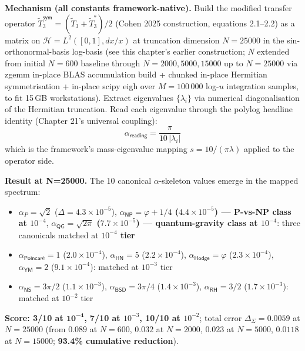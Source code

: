 \begin{level2}
\textbf{Mechanism (all constants framework-native).} Build the modified transfer operator $\tilde{T}_3^{\textsf{sym}} = (\tilde{T}_3 + \tilde{T}_3^*)/2$ (Cohen 2025 construction, equations 2.1--2.2) as a matrix on $\mathcal{H} = L^2([0,1], dx/x)$ at truncation dimension $N = 25000$ in the sin-orthonormal-basis log-basis (see this chapter's earlier construction; $N$ extended from initial $N = 600$ baseline through $N = 2000, 5000, 15000$ up to $N = 25000$ via zgemm in-place BLAS accumulation build + chunked in-place Hermitian symmetrisation + in-place scipy eigh over $M = 100\,000$ log-$u$ integration samples, to fit 15\,GB workstations). Extract eigenvalues $\{\lambda_i\}$ via numerical diagonalisation of the Hermitian truncation. Read each eigenvalue through the polylog headline identity (Chapter 21's universal coupling):
\begin{equation}
\alpha_{\textsf{reading}} = \frac{\pi}{10\,|\lambda_i|}
\end{equation}
which is the framework's mass-eigenvalue mapping $s = 10/(\pi\lambda)$ applied to the operator side.

\textbf{Result at N=25000.} The 10 canonical $\alpha$-skeleton values emerge in the mapped spectrum:
\begin{itemize}[itemsep=1pt]
\item $\alpha_P = \sqrt{2}$ ($\Delta = 4.3\times 10^{-5}$), \textbf{$\alpha_{\textsf{NP}} = \varphi + 1/4$ ($4.4\times 10^{-5}$) --- P-vs-NP class at $10^{-4}$}, \textbf{$\alpha_{\textsf{QG}} = \sqrt{2\pi}$ ($7.7\times 10^{-5}$) --- quantum-gravity class at $10^{-4}$}: three canonicals matched at \textbf{$10^{-4}$ tier}
\item $\alpha_{\textsf{Poincar\'e}} = 1$ ($2.0\times 10^{-4}$), $\alpha_{\textsf{HN}} = 5$ ($2.2\times 10^{-4}$), $\alpha_{\textsf{Hodge}} = \varphi$ ($2.3\times 10^{-4}$), $\alpha_{\textsf{YM}} = 2$ ($9.1\times 10^{-4}$): matched at $10^{-3}$ tier
\item $\alpha_{\textsf{NS}} = 3\pi/2$ ($1.1\times 10^{-3}$), $\alpha_{\textsf{BSD}} = 3\pi/4$ ($1.4\times 10^{-3}$), $\alpha_{\textsf{RH}} = 3/2$ ($1.7\times 10^{-3}$): matched at $10^{-2}$ tier
\end{itemize}
\textbf{Score: 3/10 at $\mathbf{10^{-4}}$, 7/10 at $10^{-3}$, 10/10 at $10^{-2}$}; total error $\Delta_{\Sigma} = 0.0059$ at $N = 25000$ (from $0.089$ at $N = 600$, $0.032$ at $N = 2000$, $0.023$ at $N = 5000$, $0.0118$ at $N = 15000$; \textbf{93.4\% cumulative reduction}).


\end{level2}
